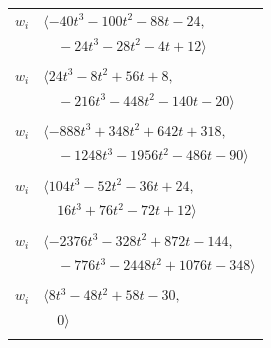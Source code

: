 \documentclass[11pt]{article}
\begin{document}
\begin{longtable}{@{}ll@{}}
$w_i$ & $\langle -40t^{3}-100t^{2}-88t-24,$\\
 & $\quad -24t^{3}-28t^{2}-4t+12\rangle$\\
\addlinespace[2pt]
\multicolumn{2}{@{}p{0.97\textwidth}@{}}{$i=54$, $D_i=8$, $\rho_{ij}$: $0{:}2, \allowbreak 4{:}1, \allowbreak 12{:}2, \allowbreak 14{:}2, \allowbreak 16{:}2, \allowbreak 22{:}2, \allowbreak 39{:}1, \allowbreak 45{:}1$}\\
$w_i$ & $\langle 24t^{3}-8t^{2}+56t+8,$\\
 & $\quad -216t^{3}-448t^{2}-140t-20\rangle$\\
\addlinespace[2pt]
\multicolumn{2}{@{}p{0.97\textwidth}@{}}{$i=55$, $D_i=8$, $\rho_{ij}$: $11{:}1, \allowbreak 14{:}1, \allowbreak 22{:}2, \allowbreak 23{:}1, \allowbreak 33{:}2, \allowbreak 34{:}1, \allowbreak 35{:}2, \allowbreak 38{:}1, \allowbreak 53{:}2, \allowbreak 56{:}2, \allowbreak 61{:}2$}\\
$w_i$ & $\langle -888t^{3}+348t^{2}+642t+318,$\\
 & $\quad -1248t^{3}-1956t^{2}-486t-90\rangle$\\
\addlinespace[2pt]
\multicolumn{2}{@{}p{0.97\textwidth}@{}}{$i=56$, $D_i=2$, $\rho_{ij}$: $2{:}2, \allowbreak 6{:}1, \allowbreak 10{:}1, \allowbreak 24{:}2, \allowbreak 35{:}1, \allowbreak 55{:}1, \allowbreak 57{:}2, \allowbreak 58{:}1$}\\
$w_i$ & $\langle 104t^{3}-52t^{2}-36t+24,$\\
 & $\quad 16t^{3}+76t^{2}-72t+12\rangle$\\
\addlinespace[2pt]
\multicolumn{2}{@{}p{0.97\textwidth}@{}}{$i=57$, $D_i=8$, $\rho_{ij}$: $4{:}2, \allowbreak 8{:}2, \allowbreak 18{:}2, \allowbreak 19{:}1, \allowbreak 21{:}2, \allowbreak 23{:}2, \allowbreak 24{:}2, \allowbreak 33{:}2, \allowbreak 50{:}1, \allowbreak 56{:}1, \allowbreak 62{:}1, \allowbreak 63{:}1$}\\
$w_i$ & $\langle -2376t^{3}-328t^{2}+872t-144,$\\
 & $\quad -776t^{3}-2448t^{2}+1076t-348\rangle$\\
\addlinespace[2pt]
\multicolumn{2}{@{}p{0.97\textwidth}@{}}{$i=58$, $D_i=2$, $\rho_{ij}$: $2{:}2, \allowbreak 5{:}2, \allowbreak 17{:}2, \allowbreak 19{:}2, \allowbreak 22{:}1, \allowbreak 24{:}2, \allowbreak 56{:}2$}\\
$w_i$ & $\langle 8t^{3}-48t^{2}+58t-30,$\\
 & $\quad 0\rangle$\\
\addlinespace[2pt]
\multicolumn{2}{@{}p{0.97\textwidth}@{}}{$i=59$, $D_i=2$, $\rho_{ij}$: $1{:}1, \allowbreak 3{:}2, \allowbreak 13{:}1, \allowbreak 17{:}1, \allowbreak 18{:}1, \allowbreak 30{:}1, \allowbreak 35{:}2, \allowbreak 45{:}2, \allowbreak 47{:}2, \allowbreak 49{:}1, \allowbreak 61{:}2$}\\

\end{longtable}
\end{document}
